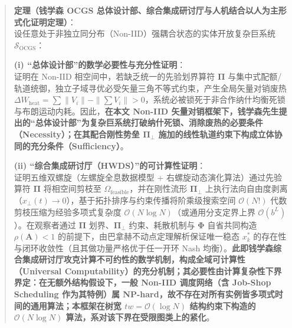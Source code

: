 \documentclass[
]{article}
\begin{document}
\begin{quote}
\textbf{定理（钱学森 OCGS
总体设计部、综合集成研讨厅与人机结合以人为主形式化证明定理）}：\\
设任意处于非独立同分布（Non-IID）强耦合状态的实体开放复杂巨系统
\(\mathcal{S}_{\text{OCGS}}\)：

\textbf{(i) ``总体设计部''的数学必要性与充分性证明}：\\
证明在 Non-IID 相空间中，若缺乏统一的先验划界算符 \(\mathbf{\Pi}\)
与集中式配额/轨道统御，独立子域寻优必受矢量三角不等式约束，产生全局矢量对销废热
\(\Delta W_{\text{heat}} = \sum \|V_i\| - \|\sum V_i\| > 0\)，系统必被锁死于非合作纳什均衡死锁与布朗运动内耗。因此，\textbf{在本文
Non-IID
矢量对销框架下，钱学森先生提出的``总体设计部''为复杂巨系统打破纳什死锁、消除废热的必要条件（Necessity）；在其配合刚性势垒
\(\mathbf{\Pi}_\bot\)
施加的线性轨道约束下构成立体协同的充分条件（Sufficiency）}。

\textbf{(ii) ``综合集成研讨厅（HWDS）''的可计算性证明}：\\
证明五维双螺旋（左螺旋全息数据模型 + 右螺旋动态演化算法）通过先验算符
\(\mathbf{\Pi}\) 将相空间剪枝至
\(\Omega_{\mathrm{feasible}}\)，并在刚性流形 \(\mathbf{\Pi}_\bot\)
上执行法向自由度剥离（\(x_\bot(t) \to 0\)），基于拓扑排序与约束传播将阶乘级搜索空间
\(\mathcal{O}(N!)\) 代数剪枝压缩为经验多项式复杂度
\(\mathcal{O}(N \log N)\)（或通用分支定界上界
\(\mathcal{O}(b^L)\)）。在观察者通过 \(\mathbf{\Pi}\)
划界、\(\mathbf{\Pi}_\bot\) 约束、耗散机制与 \(\mathbf{\Phi}\)
自省共同构造 \(\rho(\mathbf{A}) < 1\)
的前提下，由巴拿赫不动点定理解析保证唯一稳态 \(x_k^\ast\)
的存在性与闭环收敛性（且其做功量严格优于任一开环 Nash
均衡）。\textbf{此即钱学森综合集成研讨厅攻克计算不可约性的数学机制，构成全域可计算性（Universal
Computability）的充分机制；其必要性由计算复杂性下界界定：在无额外结构假设下，一般
Non-IID 调度网络（含 Job-Shop Scheduling 作为其特例）属
NP-hard，故不存在对所有实例皆多项式时间的通用算法；本框架在树宽
\(tw=\mathcal{O}(\log N)\) 结构约束下构造的 \(\mathcal{O}(N\log N)\)
算法，系对该下界在受限图类上的紧化}。


\end{quote}
\end{document}
